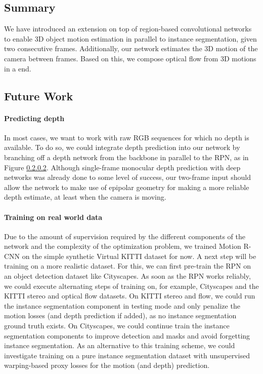 \subsection{Summary}
We have introduced an extension on top of region-based convolutional networks to enable 3D object motion estimation
in parallel to instance segmentation, given two consecutive frames. Additionally, our network estimates the 3D
motion of the camera between frames. Based on this, we compose optical flow from 3D motions in a end.


\subsection{Future Work}
\paragraph{Predicting depth}
In most cases, we want to work with raw RGB sequences for which no depth is available.
To do so, we could integrate depth prediction into our network by branching off a
depth network from the backbone in parallel to the RPN, as in Figure \ref{}.
Although single-frame monocular depth prediction with deep networks was already done
to some level of success,
our two-frame input should allow the network to make use of epipolar
geometry for making a more reliable depth estimate, at least when the camera
is moving.

\paragraph{Training on real world data}
Due to the amount of supervision required by the different components of the network
and the complexity of the optimization problem,
we trained Motion R-CNN on the simple synthetic Virtual KITTI dataset for now.
A next step will be training on a more realistic dataset.
For this, we can first pre-train the RPN on an object detection dataset like
Cityscapes. As soon as the RPN works reliably, we could execute alternating
steps of training on, for example, Cityscapes and the KITTI stereo and optical flow datasets.
On KITTI stereo and flow, we could run the instance segmentation component in testing mode and only penalize
the motion losses (and depth prediction if added), as no instance segmentation ground truth exists.
On Cityscapes, we could continue train the instance segmentation components to
improve detection and masks and avoid forgetting instance segmentation.
As an alternative to this training scheme, we could investigate training on a pure
instance segmentation dataset with unsupervised warping-based proxy losses for the motion (and depth) prediction.

